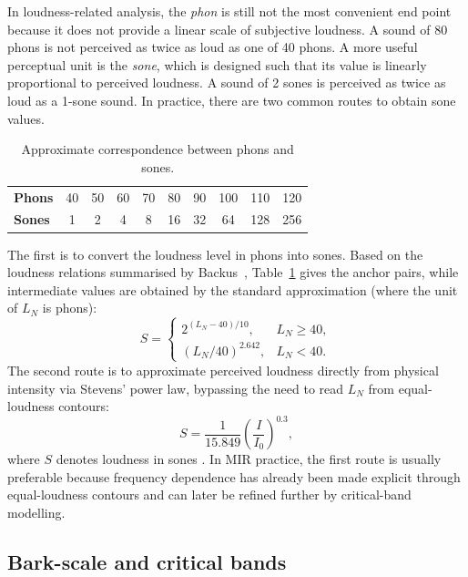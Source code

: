 In loudness-related analysis, the \emph{phon} is still not the most convenient end point because it does not provide a linear scale of subjective loudness. A sound of 80 phons is not perceived as twice as loud as one of 40 phons. A more useful perceptual unit is the \emph{sone}, which is designed such that its value is linearly proportional to perceived loudness. A sound of 2 sones is perceived as twice as loud as a 1-sone sound. In practice, there are two common routes to obtain sone values.

\begin{table}[!htbp]
\centering
\caption{Approximate correspondence between phons and sones.}
\label{tab:phons_sones_simple}
\setlength{\tabcolsep}{10pt}
\fontsize{11pt}{13pt}\selectfont
\renewcommand{\arraystretch}{1.3}
\begin{tabular}{lccccccccc}
\toprule
\textbf{Phons} & 40 & 50 & 60 & 70 & 80 & 90 & 100 & 110 & 120\\
\textbf{Sones} & 1  & 2  & 4  & 8  & 16 & 32 & 64  & 128 & 256\\
\bottomrule
\end{tabular}
\end{table}

The first is to convert the loudness level in phons into sones. Based on the loudness relations summarised by Backus~\cite{backus1977acoustical}, Table~\ref{tab:phons_sones_simple} gives the anchor pairs, while intermediate values are obtained by the standard approximation (where the unit of $L_N$ is phons):
\begin{equation}
S =
\begin{cases}
2^{(L_N-40)/10}, & L_N \ge 40,\\[4pt]
(L_N/40)^{2.642}, & L_N < 40.
\end{cases}
\label{eq:bg:phon_to_sone}
\end{equation}
The second route is to approximate perceived loudness directly from physical intensity via Stevens' power law, bypassing the need to read $L_N$ from equal-loudness contours:
\begin{equation}
S = \frac{1}{15.849}\left(\frac{I}{I_0}\right)^{0.3},
\label{eq:bg:stevens_power}
\end{equation}
where $S$ denotes loudness in sones \cite{backus1977acoustical}. In MIR practice, the first route is usually preferable because frequency dependence has already been made explicit through equal-loudness contours and can later be refined further by critical-band modelling.

\subsection{Bark-scale and critical bands}

